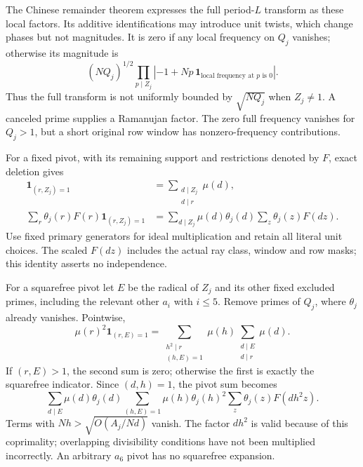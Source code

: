 The Chinese remainder theorem expresses the full period-$L$ transform
as these local factors. Its additive identifications may introduce unit
twists, which change phases but not magnitudes. It is zero if any local
frequency on $Q_j$ vanishes; otherwise its magnitude is
\begin{equation}\label{upq:gaussunion}
 (NQ_j)^{1/2}
 \prod_{p\mid Z_j}
 \left|-1+Np\,\mathbf1_{\text{local frequency at }p\text{ is }0}\right|.
\end{equation}
Thus the full transform is not uniformly bounded by $\sqrt{NQ_j}$
when $Z_j\ne1$. A canceled prime supplies a Ramanujan factor.
The zero full frequency vanishes for $Q_j>1$, but a short original
row window has nonzero-frequency contributions.

For a fixed pivot, with its remaining support and restrictions denoted
by $F$, exact deletion gives
\begin{align}
 \mathbf1_{(r,Z_j)=1}
 &=\sum_{\substack{d\mid Z_j\\d\mid r}}\mu(d),\nonumber\\
 \sum_r\theta_j(r)F(r)\mathbf1_{(r,Z_j)=1}
 &=\sum_{d\mid Z_j}\mu(d)\theta_j(d)
       \sum_z\theta_j(z)F(dz).                         \label{upq:lift}
\end{align}
Use fixed primary generators for ideal multiplication and retain all
literal unit choices. The scaled $F(dz)$ includes the actual ray class,
window and row masks; this identity asserts no independence.

For a squarefree pivot let $E$ be the radical of $Z_j$ and its other
fixed excluded primes, including the relevant other $a_i$ with $i\le5$.
Remove primes of $Q_j$, where $\theta_j$ already vanishes. Pointwise,
\[
 \mu(r)^2\mathbf1_{(r,E)=1}
 =\sum_{\substack{h^2\mid r\\(h,E)=1}}\mu(h)
       \sum_{\substack{d\mid E\\d\mid r}}\mu(d).
\]
If $(r,E)>1$, the second sum is zero; otherwise the first is exactly
the squarefree indicator. Since $(d,h)=1$, the pivot sum becomes
\begin{equation}\label{upq:sflift}
 \sum_{d\mid E}\mu(d)\theta_j(d)
 \sum_{(h,E)=1}\mu(h)\theta_j(h)^2
       \sum_z\theta_j(z)F(dh^2z).
\end{equation}
Terms with $Nh>\sqrt{O(A_j/Nd)}$ vanish. The factor $dh^2$ is valid
because of this coprimality; overlapping divisibility conditions have
not been multiplied incorrectly. An arbitrary $a_6$ pivot has no
squarefree expansion.


